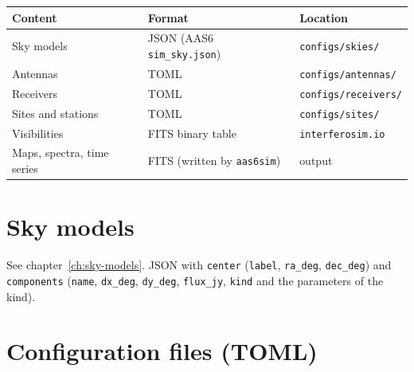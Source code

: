 \label{ch:data-formats}

\begin{center}
\begin{tabularx}{\linewidth}{@{}lLl@{}}
\toprule
Content & Format & Location \\
\midrule
Sky models & JSON (AAS6 \texttt{sim\_sky.json}) & \texttt{configs/skies/} \\
Antennas & TOML & \texttt{configs/antennas/} \\
Receivers & TOML & \texttt{configs/receivers/} \\
Sites and stations & TOML & \texttt{configs/sites/} \\
Visibilities & FITS binary table & \texttt{interferosim.io} \\  %
Maps, spectra, time series & FITS (written by \texttt{aas6sim}) & output \\
\bottomrule
\end{tabularx}
\end{center}

\section{Sky models}

See chapter~\ref{ch:sky-models}. JSON with \texttt{center}
(\texttt{label}, \texttt{ra\_deg}, \texttt{dec\_deg}) and
\texttt{components} (\texttt{name}, \texttt{dx\_deg}, \texttt{dy\_deg},
\texttt{flux\_jy}, \texttt{kind} and the parameters of the kind).

\section{Configuration files (TOML)}

